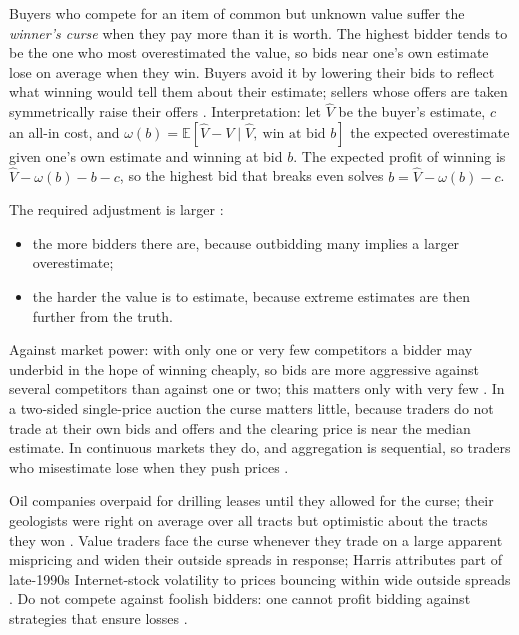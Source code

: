 \begin{qfdefinition}\label{def:winners-curse}
 Buyers who compete for an item of common but unknown value suffer the \emph{winner's curse} when they pay more than it is worth. The highest bidder tends to be the one who most overestimated the value, so bids near one's own estimate lose on average when they win. Buyers avoid it by lowering their bids to reflect what winning would tell them about their estimate; sellers whose offers are taken symmetrically raise their offers \citep[chap.~``Value Traders'', sec.~16.2.1.2, pp.~341--342]{alpha-harris}. Interpretation: let $\widehat V$ be the buyer's estimate, $c$ an all-in cost, and $\omega(b)=\mathbb{E}[\widehat V-V\mid\widehat V,\ \text{win at bid }b]$ the expected overestimate given one's own estimate and winning at bid $b$. The expected profit of winning is $\widehat V-\omega(b)-b-c$, so the highest bid that breaks even solves $b=\widehat V-\omega(b)-c$.

 The required adjustment is larger \citep[same sec., p.~342]{alpha-harris}:
\begin{itemize}
\item the more bidders there are, because outbidding many implies a larger overestimate;
\item the harder the value is to estimate, because extreme estimates are then further from the truth.
\end{itemize}
Against market power: with only one or very few competitors a bidder may underbid in the hope of winning cheaply, so bids are more aggressive against several competitors than against one or two; this matters only with very few \citep[same sec., p.~342]{alpha-harris}. In a two-sided single-price auction the curse matters little, because traders do not trade at their own bids and offers and the clearing price is near the median estimate. In continuous markets they do, and aggregation is sequential, so traders who misestimate lose when they push prices \citep[same sec., pp.~342--343]{alpha-harris}.

 Oil companies overpaid for drilling leases until they allowed for the curse; their geologists were right on average over all tracts but optimistic about the tracts they won \citep[same chap., box, p.~342]{alpha-harris}. Value traders face the curse whenever they trade on a large apparent mispricing and widen their outside spreads in response; Harris attributes part of late-1990s Internet-stock volatility to prices bouncing within wide outside spreads \citep[same chap., p.~343 and box]{alpha-harris}. Do not compete against foolish bidders: one cannot profit bidding against strategies that ensure losses \citep[same chap., p.~342]{alpha-harris}.


\end{qfdefinition}
